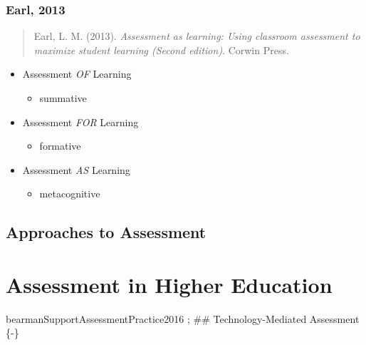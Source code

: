 \documentclass[
]{book}
\providecommand{\tightlist}{%
  \setlength{\itemsep}{0pt}\setlength{\parskip}{0pt}}
\begin{document}
\hypertarget{earl-2013}{%
\subsubsection*{Earl, 2013}\label{earl-2013}}

\begin{quote}
Earl, L. M. (2013). \emph{Assessment as learning: Using classroom assessment to maximize student learning (Second edition)}. Corwin Press.
\end{quote}

\begin{itemize}
\tightlist
\item
  Assessment \emph{OF} Learning

  \begin{itemize}
  \tightlist
  \item
    summative
  \end{itemize}
\item
  Assessment \emph{FOR} Learning

  \begin{itemize}
  \tightlist
  \item
    formative
  \end{itemize}
\item
  Assessment \emph{AS} Learning

  \begin{itemize}
  \tightlist
  \item
    metacognitive
  \end{itemize}
\end{itemize}

\hypertarget{approaches-to-assessment}{%
\subsection*{Approaches to Assessment}\label{approaches-to-assessment}}

\hypertarget{assessment-in-higher-education}{%
\section*{Assessment in Higher Education}\label{assessment-in-higher-education}}

bearmanSupportAssessmentPractice2016
\citet{lipnevichWhatGradesMean2020}; \citet{masseyAssessmentLiteracyCollege2020}
\#\# Technology-Mediated Assessment \{-\}
\end{document}
